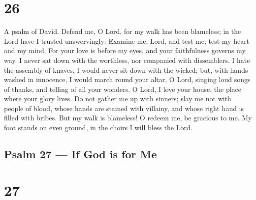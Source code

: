\hypertarget{section-25}{%
\section{26}\label{section-25}}

A psalm of David.  Defend me, O Lord, for my walk has been
blameless; in the Lord have I trusted unswervingly:  Examine
me, Lord, and test me; test my heart and my mind.  For your
love is before my eyes, and your faithfulness governs my way.
 I never sat down with the worthless, nor companied with
dissemblers.  I hate the assembly of knaves, I would never
sit down with the wicked;  but, with hands washed in
innocence, I would march round your altar, O Lord,  singing
loud songs of thanks, and telling of all your wonders.  O
Lord, I love your house, the place where your glory lives. 
Do not gather me up with sinners; slay me not with people of blood,
 whose hands are stained with villainy, and whose right
hand is filled with bribes.  But my walk is blameless! O
redeem me, be gracious to me.  My foot stands on even
ground, in the choirs I will bless the Lord.

\hypertarget{psalm-27-if-god-is-for-me}{%
\subsection{Psalm 27 --- If God is for
Me}\label{psalm-27-if-god-is-for-me}}

\hypertarget{section-26}{%
\section{27}\label{section-26}}

